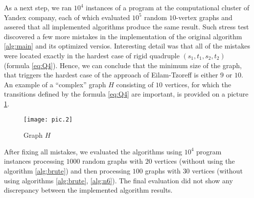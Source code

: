 As a next step, we ran $10^4$ instances of a program at the computational cluster of Yandex company, each of which evaluated $10^5$ random $10$-vertex graphs and assered that all implemented algorithms  produce the same result. Such stress test discovered a few more mistakes in the implementation of the original algorithm \ref{alg:main} and its optimized versios. Interesting detail was that all of the mistakes were located exactly in the hardest case of rigid quadruple $(s_1, t_1, s_2, t_2)$ (formula \eqref{eq:Q4}). Hence, we can conclude that the minimum size of the graph, that triggers the hardest case of the approach of Eilam-Tzoreff is either $9$ or $10$. An example of a ``complex'' graph $H$ consisting of $10$ vertices, for which the transitions defined by the formula \eqref{eq:Q4} are important, is provided on a picture \ref{pic:hard}.

\begin{figure}[H]
\caption{Graph $H$}
\label{pic:hard}
\centering
\texttt{[image: pic.2]}
\end{figure}

After fixing all mistakes, we evaluated the algorithms using $10^4$ program instances processing $1000$ random graphs with $20$ vertices (without using the algorithm \ref{alg:brute}) and then processing $100$ graphs with $30$ vertices (without using algorithms \ref{alg:brute}, \ref{alg:n6}). The final evaluation did not show any discrepancy between the implemented algorithm results.
